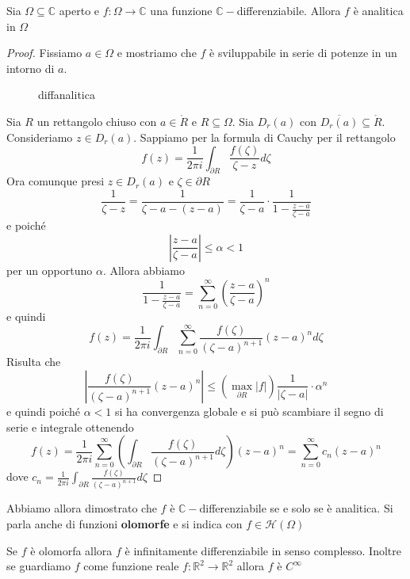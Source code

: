 \begin{theorem}
    Sia \(\Omega \subseteq \mathbb{C} \) aperto e \(f : \Omega \to \mathbb{C}\)
    una funzione \(\mathbb{C}-\)differenziabile. Allora \(f\) è analitica in
    \(\Omega\) 
\end{theorem}
\begin{proof}
    Fissiamo \(a \in \Omega\) e mostriamo che \(f\) è sviluppabile in serie di
    potenze in un intorno di \(a\).
\begin{figure}[ht]
    \centering
    \caption{diffanalitica}
    \label{fig:diffanalitica}
\end{figure}
Sia \(R\) un rettangolo chiuso con \(a \in \mathring{R}\) e \(R \subseteq \Omega
\). Sia \(D_r{(a)}\) con \(\overline{D_r{(a)}} \subseteq \mathring{R} \).
Consideriamo \(z \in D_r{(a)}\). Sappiamo per la formula di Cauchy per il
rettangolo 
\[
    f{(z)} = \frac{1}{2\pi i} \int_{\partial R} \frac{f(\zeta)}{\zeta-z} d\zeta
\]
Ora comunque presi \(z \in D_r{(a)}\) e \(\zeta \in \partial R\) 
\[
    \frac{1}{\zeta - z} = \frac{1}{\zeta - a - (z-a)} = \frac{1}{\zeta - a}
    \cdot \frac{1}{1 - \frac{z-a}{\zeta-a}}
\]
e poiché
\[
    \left| \frac{z-a}{\zeta - a} \right| \le \alpha < 1
\]
per un opportuno \(\alpha\). Allora abbiamo
\[
    \frac{1}{1 - \frac{z-a}{\zeta-a}} = \sum_{n=0}^{\infty} {\left( \frac{z-a}{\zeta
    - a} \right)}^{n}
\]
e quindi
\[
    f{(z)} = \frac{1}{2\pi i} \int_{\partial R} \sum_{n=0}^{\infty}
    \frac{f{(\zeta)}}{{(\zeta - a)}^{n+1}} {(z-a)}^{n} d\zeta
\]
Risulta che
\[
    \left| \frac{f{(\zeta)}}{{(\zeta - a)}^{n+1}} {(z-a)}^{n} \right| \le
    {\left( \max_{\partial R} |f| \right)} \frac{1}{|\zeta - a|} \cdot \alpha
    ^{n}
\]
e quindi poiché \(\alpha < 1\) si ha convergenza globale e si può scambiare il
segno di serie e integrale ottenendo
\[
    f{(z)} = \frac{1}{2\pi i} \sum_{n=0}^{\infty} {\left( \int_{\partial R}
    \frac{f{(\zeta)}}{{(\zeta -a)}^{n+1}} d \zeta \right)} {(z-a)}^{n} =
    \sum_{n=0}^{\infty} c_{n} {(z-a)}^{n}
\]
dove \(\displaystyle c_{n} = \frac{1}{2\pi i} \int_{\partial R}
\frac{f{(\zeta)}}{{(\zeta - a)}^{n+1}} d \zeta \) 
\end{proof}

Abbiamo allora dimostrato che \(f\) è \(\mathbb{C}-\)differenziabile se e solo
se è analitica. Si parla anche di funzioni \textbf{olomorfe} e si indica con \(f
\in \mathcal{H}{(\Omega)}\) 
\begin{remark}
    Se \(f\) è olomorfa allora \(f\) è infinitamente differenziabile in senso
    complesso. Inoltre se guardiamo \(f\) come funzione reale \(f:
    \mathbb{R}^{2} \to \mathbb{R}^{2}\) allora \(f\) è \(C^{\infty}\)
\end{remark}

